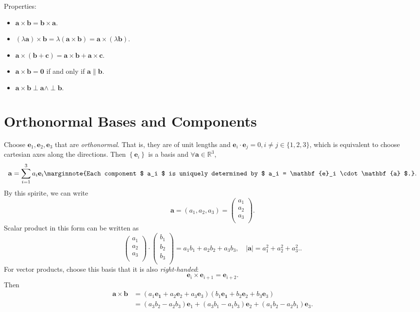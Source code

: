 \documentclass[10pt]{article}
\begin{document}
    Properties:
    \begin{itemize}
        \item $ \mathbf{a} \times \mathbf{b}=\mathbf{b}\times \mathbf{a} $.
        \item $ (\lambda \mathbf{a})\times \mathbf{b}=\lambda(\mathbf{a}\times \mathbf{b})=\mathbf{a} \times (\lambda\mathbf{b}) $.
        \item $ \mathbf{a}\times (\mathbf{b}+\mathbf{c})=\mathbf{a}\times \mathbf{b}+\mathbf{a}\times \mathbf{c} $.
        \item $ \mathbf{a} \times \mathbf{b}=\mathbf{0} $ if and only if $ \mathbf{a} \parallel \mathbf{b} $.
        \item $ \mathbf{a}\times \mathbf{b} \perp \mathbf{a} \land \perp \mathbf{b} $.
    \end{itemize}
    \section{Orthonormal Bases and Components}
    Choose $ \mathbf{e}_1, \mathbf{e}_2, \mathbf{e}_3 $ that are \textit{orthonormal}. That is, they are of unit lengths and $ \mathbf{e}_i\cdot \mathbf{e}_j =0, i\neq j\in \{1,2,3\}$, which is equivalent to choose cartesian axes along the directions. Then $ \left\{ \mathbf{e}_i\right\} $ is a basis and $ \forall \mathbf{a}\in \mathbb{R}^3 $, 
    \[
        \mathbf{a}=\sum_{i=1}^{3}a_i \mathbf{e}_i \marginnote{Each component $ a_i $ is uniquely determined by $ a_i = \mathbf{e}_i \cdot \mathbf{a} $.}
    .\]
    By this spirite, we can write 
    \[
        \mathbf{a} = (a_1,a_2,a_3) = \begin{pmatrix}
            a_1\\ 
            a_2\\ 
            a_3\\
            \end{pmatrix}
    .\]
    Scalar product in this form can be written as 
    \[
        \begin{pmatrix}
            a_1\\ 
            a_2\\ 
            a_3\\
            \end{pmatrix} \cdot \begin{pmatrix}
                b_1\\ 
                b_2\\ 
                b_3\\
                \end{pmatrix}
                =a_1b_1+a_2b_2+a_3b_3,\quad \left| \mathbf{a} \right| = a_1^2+a_2^2+a_3^2.
    .\]
    For vector products, choose this basis that it is also \textit{right-handed}:
    \[
        \mathbf{e}_i \times \mathbf{e}_{i+1}=\mathbf{e}_{i+2}
    .\]
    Then
    \[
        \begin{aligned}
            \mathbf{a}\times \mathbf{b} &= (a_1 \mathbf{e_1}+a_2 \mathbf{e}_2+a_3 \mathbf{e}_3)(b_1 \mathbf{e_1}+b_2 \mathbf{e}_2+b_3 \mathbf{e}_3)\\
            &= (a_3b_2-a_2b_3)\mathbf{e}_1+(a_3b_1-a_1b_3)\mathbf{e}_2+(a_1b_2-a_2b_1)\mathbf{e}_3.
        \end{aligned}
    \]
\end{document}
